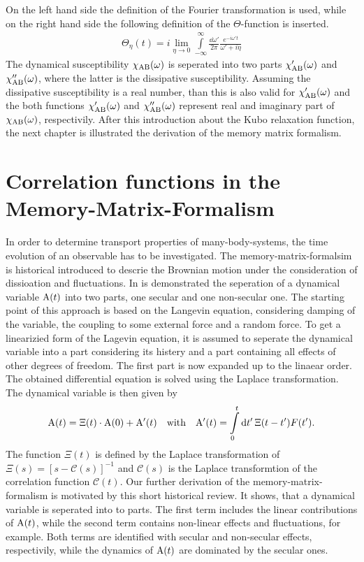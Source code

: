 %
On the left hand side the definition of the Fourier transformation is used, while on the right hand side the following definition of the $\Theta$-function is inserted.
%
\begin{align}
	\Theta_{\eta}(t) = i \lim\limits_{\eta \to 0} \int\limits_{-\infty}^{\infty} \frac{\dd{\omega'}}{2\pi} \frac{e^{-i\omega't}}{\omega' + i\eta} 
\end{align}
%
The dynamical susceptibility $\chi_{\mathrm{AB}}(\omega)$ is seperated into two parts $\chi'_{\mathrm{AB}}(\omega)$ and $\chi''_{\mathrm{AB}}(\omega)$, where the latter is the dissipative susceptibility.
Assuming the dissipative susceptibility is a real number, than this is also valid for $\chi'_{\mathrm{AB}}(\omega)$ and the both functions $\chi'_{\mathrm{AB}}(\omega)$ and $\chi''_{\mathrm{AB}}(\omega)$ represent real and imaginary part of $\chi_{\mathrm{AB}}(\omega)$, respectivily.
After this introduction about the Kubo relaxation function, the next chapter is illustrated the derivation of the memory matrix formalism.
%
%
%
\section{Correlation functions in the Memory-Matrix-Formalism}
\label{sec:deviation of the memory-matrix-formalism}
%
%
%
In order to determine transport properties of many-body-systems, the time evolution of an observable has to be investigated.
The memory-matrix-formalsim is historical introduced to descrie the Brownian motion under the consideration of dissioation and fluctuations.
In \cite{Mori} is demonstrated the seperation of a dynamical variable $\mathrm{A}(t)$ into two parts, one secular and one non-secular one.
The starting point of this approach is based on the Langevin equation, considering damping of the variable, the coupling to some external force and a random force.
To get a linearizied form of the Lagevin equation, it is assumed to seperate the dynamical variable into a part considering its histery and a part containing all effects of other degrees of freedom.
The first part is now expanded up to the linaear order.
The obtained differential equation is solved using the Laplace transformation.
The dynamical variable is then given by
%
\begin{align}
	\mt{A}(t) = \Xi(t) \cdot \mt{A}(0) + \mt{A}'(t) \qq{with} \mt{A}'(t) = \int\limits_{0}^{t} \dd{t'} \Xi(t-t') F(t').
\end{align}
%
The function $\Xi(t)$ is defined by the Laplace transformation of $\Xi(s) = [s-\mathcal{C}(s)]^{-1}$ and $\mathcal{C}(s)$ is the Laplace transformtion of the correlation function $\mathcal{C}(t)$.
Our further derivation of the memory-matrix-formalism is motivated by this short historical review.
It shows, that a dynamical variable is seperated into to parts.
The first term includes the linear contributions of $\mathrm{A}(t)$, while the second term contains non-linear effects and fluctuations, for example.
Both terms are identified with secular and non-secular effects, respectivily, while the dynamics of $\mathrm{A}(t)$ are dominated by the secular ones.

